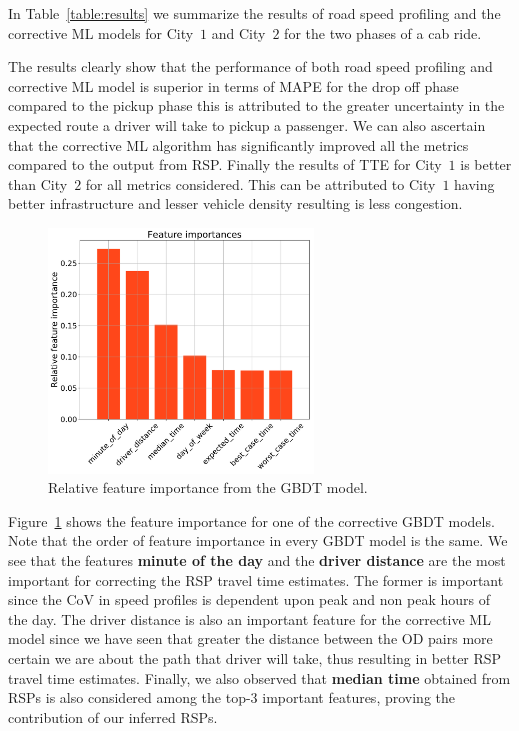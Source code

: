 In Table~\ref{table:results} we summarize the results of road speed profiling and the corrective \ac{ML} models for City~$1$ and City~$2$ for the two phases of a cab ride. 

The results clearly show that the performance of both road speed profiling and corrective \ac{ML} model is superior in terms of \ac{MAPE} for the drop off phase compared to the pickup phase this is attributed to the greater uncertainty in the expected route a driver will take to pickup a passenger. We can also ascertain that the corrective \ac{ML} algorithm has significantly improved all the metrics compared to the output from \ac{RSP}. Finally the results of \ac{TTE} for City~$1$ is better than City~$2$ for all metrics considered. This can be attributed to City~$1$ having better infrastructure and lesser vehicle density resulting is less congestion.


\begin{figure}[!tb]
	\centering
	\includegraphics[width=\columnwidth,left,height=6.5cm,keepaspectratio]{images/feauture_importance.pdf}
	
	\caption{Relative feature importance from the GBDT model.}
	\label{fig:xgb-feature-importance}
\end{figure}



Figure~\ref{fig:xgb-feature-importance} shows the feature importance for one of the corrective GBDT models. Note that the order of feature importance in every GBDT model is the same. We see that the features \textbf{minute of the day} and the \textbf{driver distance} are the most important for correcting the \ac{RSP} travel time estimates. The former is important since the \ac{CoV} in speed profiles is dependent upon peak and non peak hours of the day. The driver distance is also an important feature for the corrective \ac{ML} model since we have seen that greater the distance between the \ac{OD} pairs more certain we are about the path that driver will take, thus resulting in better \ac{RSP} travel time estimates. Finally, we also observed that \textbf{median time} obtained from RSPs is also considered among the top-3 important features, proving the contribution of our inferred RSPs.  



